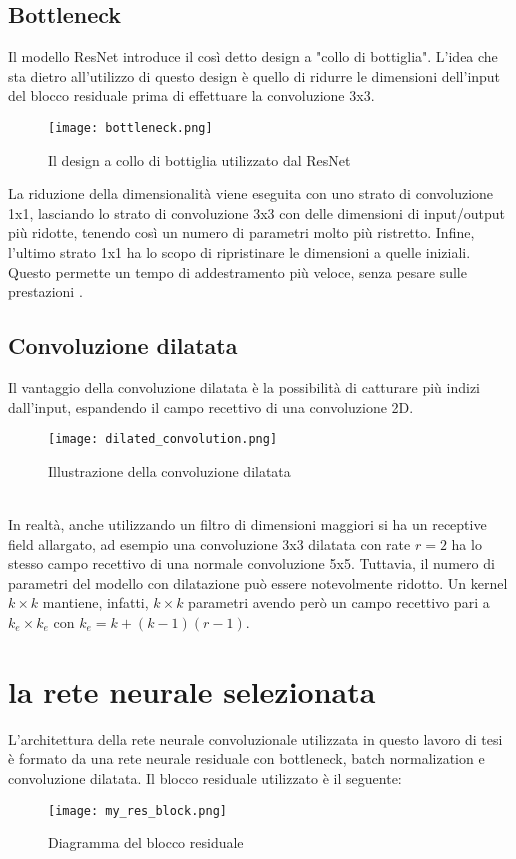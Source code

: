 \subsection{Bottleneck}
Il modello ResNet introduce il così detto design a "collo di bottiglia". L'idea che sta dietro all'utilizzo di questo design è quello di ridurre le dimensioni dell'input del blocco residuale prima di effettuare la convoluzione 3x3.  
\begin{figure}[ht]
    \centering
    \texttt{[image: bottleneck.png]}
    \caption[Bottleneck]{Il design a collo di bottiglia utilizzato dal  ResNet}
\end{figure}
La riduzione della dimensionalità viene eseguita con uno strato di convoluzione 1x1, lasciando lo strato di convoluzione 3x3 con delle dimensioni di input/output più ridotte, tenendo così un numero di parametri molto più ristretto. Infine, l'ultimo strato 1x1 ha lo scopo di ripristinare le dimensioni a quelle iniziali. Questo permette un tempo di addestramento più veloce, senza pesare sulle prestazioni \cite{resnet}.

\subsection{Convoluzione dilatata}
Il vantaggio della convoluzione dilatata è la possibilità di catturare più indizi dall'input, espandendo il campo recettivo di una convoluzione 2D. 
\begin{figure}[ht]
    \centering
    \texttt{[image: dilated\_convolution.png]}
    \caption[Convoluzione dilatata]{Illustrazione della convoluzione dilatata}
\end{figure}\\
In realtà, anche utilizzando un filtro di dimensioni maggiori si ha un receptive field allargato, ad esempio una convoluzione 3x3 dilatata con rate $r=2$ ha lo stesso campo recettivo di una normale convoluzione 5x5. Tuttavia, il numero di parametri del modello con dilatazione può essere notevolmente ridotto. Un kernel $k\times k$ mantiene, infatti, $k\times k$ parametri avendo però un campo recettivo pari a $k_e\times k_e$ con $k_e=k+(k-1)(r-1)$.

\section{la rete neurale selezionata}
L'architettura della rete neurale convoluzionale utilizzata in questo lavoro di tesi è formato da una rete neurale residuale con bottleneck, batch normalization e convoluzione dilatata. Il blocco residuale utilizzato è il seguente: 
\begin{figure}[ht]
    \centering
    \texttt{[image: my\_res\_block.png]}
    \caption[Diagramma del blocco residuale]{Diagramma del blocco residuale}
\end{figure}\\


